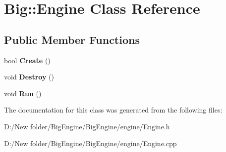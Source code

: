 \hypertarget{class_big_1_1_engine}{}\section{Big\+:\+:Engine Class Reference}
\label{class_big_1_1_engine}
\subsection*{Public Member Functions}
\begin{DoxyCompactItemize}
\item 
\mbox{\label{class_big_1_1_engine_a09a3ad079cb26e85995b229368ffa582}} 
bool {\bfseries Create} ()
\item 
\mbox{\label{class_big_1_1_engine_ac6eec511806f1b632811ac63026b7eaa}} 
void {\bfseries Destroy} ()
\item 
\mbox{\label{class_big_1_1_engine_aca50e2ddb2424a42ca2a41f13142c254}} 
void {\bfseries Run} ()
\end{DoxyCompactItemize}


The documentation for this class was generated from the following files\+:\begin{DoxyCompactItemize}
\item 
D\+:/\+New folder/\+Big\+Engine/\+Big\+Engine/engine/Engine.\+h\item 
D\+:/\+New folder/\+Big\+Engine/\+Big\+Engine/engine/Engine.\+cpp\end{DoxyCompactItemize}
